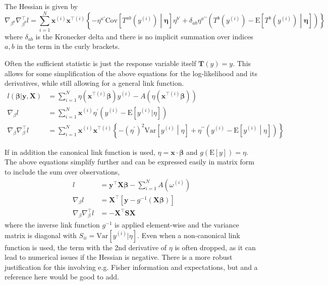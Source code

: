\documentclass{article}
\newcommand{\bbeta}{\boldsymbol{\beta}}
\begin{document}
The Hessian is given by
\begin{equation}
	\nabla_{\beta^a} \nabla^\intercal_{\beta^b} l = \sum_{i=1}^N \mathbf{x}^{(i)}
	\mathbf{x}^{\intercal(i)} \left\{ - \eta^{a \prime}
	\textrm{Cov}\left[T^{ab}(y^{(i)}) \middle| \boldsymbol{\eta}\right] \eta^{b \prime} +
	\delta_{ab} \eta^{a\prime\prime}\left( T^b (y^{(i)}) -
	\textrm{E}\left[T^b(y^{(i)}) \middle| \boldsymbol{\eta} \right] \right) \right\}
\end{equation}
where \(\delta_{ab}\) is the Kronecker delta and there is no implicit
summation over indices \(a, b\) in the term in the curly brackets.

Often the sufficient statistic is just the response variable itself
\(\mathbf{T}(y) = y\). This allows for some simplification of the above
equations for the log-likelihood and its derivatives, while still allowing for a
general link function.
\begin{align}
	l(\bbeta | \mathbf{y}, \mathbf{X})        & = \sum_{i=1}^N
	\eta(\mathbf{x}^{\intercal(i)} \bbeta) y^{(i)} -
	A\left(\eta(\mathbf{x}^{\intercal(i)} \bbeta) \right)                                                      \\
	\nabla_{\beta} l                          & = \sum_{i=1}^N \mathbf{x}^{(i)} \eta^{\prime} \left( y^{(i)} -
	\textrm{E}[y^{(i)}|\eta] \right)                                                                           \\
	\nabla_{\beta} \nabla^\intercal_{\beta} l & = \sum_{i=1}^N \mathbf{x}^{(i)}
	\mathbf{x}^{\intercal(i)} \left\{ - (\eta^{\prime})^2 \textrm{Var}\left[y^{(i)}
		\middle| \eta\right] + \eta^{\prime\prime}\left( y^{(i)} -
	\textrm{E}\left[y^{(i)} \middle| \eta \right] \right) \right\}
\end{align}

If in addition the canonical link function is used, \(\eta = \mathbf{x} \cdot
\bbeta\) and \(g(\textrm{E}[y]) = \eta\). The above equations
simplify further and can be expressed easily in matrix form to include the sum
over observations,
\begin{align}
	l                                     & = \mathbf{y}^\intercal \mathbf{X} \bbeta - \sum_{i=1}^N
	A\left(\omega^{(i)} \right)                                                                                        \\
	\nabla_\beta l                        & = \mathbf{X}^\intercal \left[ \mathbf{y} - g^{-1}(\mathbf{X}\bbeta)\right] \\
	\nabla_\beta \nabla_\beta^\intercal l & = - \mathbf{X}^\intercal \mathbf{S} \mathbf{X}
\end{align}
where the inverse link function \(g^{-1}\) is applied element-wise and the
variance matrix is diagonal with \(S_{ii} = \textrm{Var}[y^{(i)}|\eta]\). Even
when a non-canonical link function is used, the term with the 2nd derivative of
\(\eta\) is often dropped, as it can lead to numerical issues if the Hessian is
negative. There is a more robust justification for this involving e.g. Fisher
information and expectations, but and a reference here would be good to add.
\end{document}
